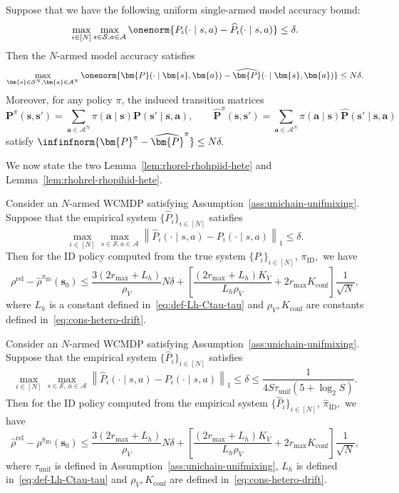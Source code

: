 \documentclass[mnsc,nonblindrev]{informs3}
\newcommand{\bp}{\bm{P}}
\newcommand{\bphat}{\widehat{\bm{P}}}
\newcommand{\rhohat}{\widehat{\rho}}
\newcommand{\piid}{\pi_{\mathrm{ID}}}
\newcommand{\pihid}{\widehat{\pi}_{\mathrm{ID}}}
\newcommand{\tmix}{\tau_{\mathrm{unif}}}
\newcommand{\bms}{\bm{s}}
\newcommand{\bma}{\bm{a}}
\newcommand{\rhorel}{\rho^{\mathrm{rel}}}
\newcommand{\rhohrel}{\widehat{\rho}^{\mathrm{rel}}}
\newcommand{\States}{\mathcal{S}}
\newcommand{\Actions}{\mathcal{A}}
\begin{document}
\begin{lemma}
\label{lem:lift-single-to-Narm}
Suppose that we have the following uniform single-armed model accuracy bound: 
\[
    \max_{i\in[N]}\max_{s\in\States,a\in\Actions}
    \onenorm{P_i(\cdot\mid s,a)-\widehat P_i(\cdot\mid s,a)}
    \le
    \delta .
\]
Then the $N$-armed model accuracy satisfies
\[
    \max_{\bms\in\States^N,\bma\in\Actions^N}
    \onenorm{\bp(\cdot\mid\bms,\bma)-\bphat(\cdot\mid\bms,\bma)}
    \le
    N\delta .
\]
Moreover, for any policy \(\pi\), the induced transition matrices
\[
    \bp^\pi(\bms,\bms')
    =
    \sum_{\bma\in\Actions^N}
    \pi(\bma\mid\bms)\bp(\bms'\mid\bms,\bma),
    \qquad
    \bphat^\pi(\bms,\bms')
    =
    \sum_{\bma\in\Actions^N}
    \pi(\bma\mid\bms)\bphat(\bms'\mid\bms,\bma)
\]
satisfy
\(
    \infinfnorm{\bp^\pi-\bphat^\pi}
    \le
    N\delta .
\)
\end{lemma}

We now state the two Lemma~\ref{lem:rhorel-rhohpiid-hete} and Lemma~\ref{lem:rhohrel-rhopihid-hete}.
\begin{lemma}\label{lem:rhorel-rhohpiid-hete}
Consider an $N$-armed WCMDP satisfying
Assumption~\ref{ass:unichain-unifmixing}. Suppose that the empirical system $\{\widehat{P}_i\}_{i\in[N]}$ satisfies 
\[
\max_{i\in[N]}\max_{s \in \mathcal{S},a \in \mathcal{A}} \left\| \widehat{P}_i(\cdot \mid s, a) - P_i(\cdot \mid s, a) \right\|_1 \le \delta.
\]
Then for the ID policy computed from the true system $\{{P}_i\}_{i\in[N]}$, $\piid,$ we have
    \[\rhorel - \rhohat^{\piid}(\bms_0)\le \frac{3(2r_{\max}+L_h)}{\rho_V}N\delta+\left[\frac{(2r_{\max}+L_h)K_V}{L_h\rho_V}+2 r_{\max}K_{\mathrm{conf}}\right]\frac{1}{\sqrt{N}},\]
where $L_h$ is a constant defined in~\eqref{eq:def-Lh-Ctau-tau} and $\rho_V, K_{\mathrm{conf}}$ are constants defined in~\eqref{eq:cons-hetero-drift}.   
\end{lemma}
\begin{lemma}\label{lem:rhohrel-rhopihid-hete}
Consider an $N$-armed WCMDP  satisfying
Assumption~\ref{ass:unichain-unifmixing}. Suppose that the empirical system $\{\widehat{P}_i\}_{i\in[N]}$ satisfies
\[
\max_{i\in[N]}\max_{s \in \mathcal{S},\ a \in \mathcal{A}} \left\| \widehat{P}_i(\cdot \mid s, a) - P_i(\cdot \mid s, a) \right\|_1 \le \delta\le\frac{1}{4S\tmix(5+\log_2S)}.
\]
Then for the ID policy computed from the empirical system $\{\widehat{P}_i\}_{i\in[N]}$, $\pihid,$ we have
    \[\rhohrel - \rho^{\pihid}(\bms_0)\le \frac{3(2r_{\max}+L_h)}{\rho_V}N\delta+\left[\frac{(2r_{\max}+L_h)K_V}{L_h\rho_V}+2 r_{\max}K_{\mathrm{conf}}\right]\frac{1}{\sqrt{N}},\]
where $\tmix$ is defined in Assumption~\ref{ass:unichain-unifmixing}, $L_h$ is defined in~\eqref{eq:def-Lh-Ctau-tau} and $\rho_V, K_{\mathrm{conf}}$ are defined in~\eqref{eq:cons-hetero-drift}.
\end{lemma}
\end{document}
